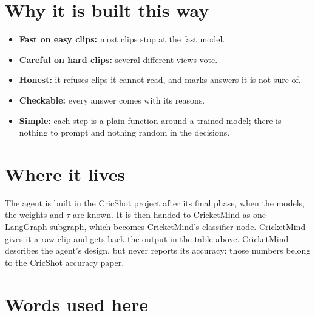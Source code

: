 \documentclass[11pt,a4paper]{article}
\begin{document}
\section{Why it is built this way}

\begin{itemize}[nosep, leftmargin=1.4em]
  \item \textbf{Fast on easy clips:} most clips stop at the fast model.
  \item \textbf{Careful on hard clips:} several different views vote.
  \item \textbf{Honest:} it refuses clips it cannot read, and marks answers
        it is not sure of.
  \item \textbf{Checkable:} every answer comes with its reasons.
  \item \textbf{Simple:} each step is a plain function around a trained
        model; there is nothing to prompt and nothing random in the
        decisions.
\end{itemize}

\section{Where it lives}

The agent is built in the CricShot project after its final phase, when
the models, the weights and $\tau$ are known. It is then handed to
CricketMind as one LangGraph subgraph, which becomes CricketMind's
classifier node. CricketMind gives it a raw clip and gets back the output
in the table above. CricketMind describes the agent's design, but never
reports its accuracy: those numbers belong to the CricShot accuracy paper.

\section*{Words used here}
\end{document}
